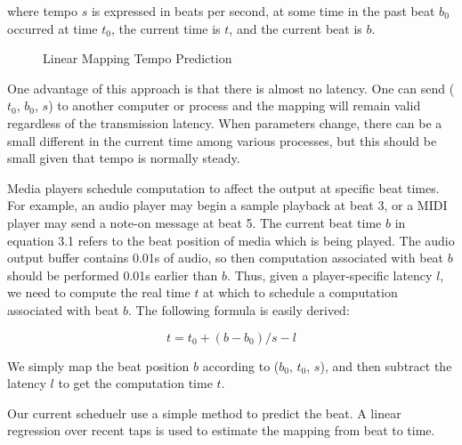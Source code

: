 where tempo $s$ is expressed in beats per second, at some time in the past beat $b_0$
occurred at time $t_0$, the current time is $t$, and the current beat is $b$.

\begin{figure}[H]
\caption{Linear Mapping Tempo Prediction \cite{Dawen:ISMIR2011}}
\end{figure}

One advantage of this approach is that there is almost no latency.
One can send ($t_0$, $b_0$, $s$) to another computer or process and the 
mapping will remain valid regardless of the transmission latency. 
When parameters change, there can be a small different in the current 
time among various processes, but this should be small given that tempo 
is normally steady.

Media players schedule computation to affect the output at specific beat
times. For example, an audio player may begin a sample playback at beat 3, or a
MIDI player may send a note-on message at beat 5. The current beat time $b$ in 
equation 3.1 refers to the beat position of media which is being played.
The audio output buffer contains 0.01s of audio, so then computation associated 
with beat $b$ should be performed 0.01s earlier than $b$. Thus, given a 
player-specific latency $l$, we need to compute the real time $t$ at which to 
schedule a computation associated
with beat $b$. The following formula is easily derived:

\begin{equation}
t = t_0 + (b - b_0) / s - l
\end{equation}

We simply map the beat position $b$ according to ($b_0$, $t_0$, $s$), and then subtract the
latency $l$ to get the computation time $t$.

Our current scheduelr use a simple method to predict the beat. 
A linear regression over recent taps is used to estimate the
mapping from beat to time. 

